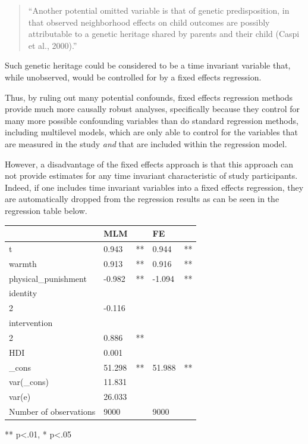\documentclass[
  letterpaper,
  DIV=11,
  numbers=noendperiod]{scrreprt}
\begin{document}
\begin{quote}
``Another potential omitted variable is that of genetic predisposition,
in that observed neighborhood effects on child outcomes are possibly
attributable to a genetic heritage shared by parents and their child
(Caspi et al., 2000).''
\end{quote}

Such genetic heritage could be considered to be a time invariant
variable that, while unobserved, would be controlled for by a fixed
effects regression.

Thus, by ruling out many potential confounds, fixed effects regression
methods provide much more causally robust analyses, specifically because
they control for many more possible confounding variables than do
standard regression methods, including multilevel models, which are only
able to control for the variables that are measured in the study
\emph{and} that are included within the regression model.

However, a disadvantage of the fixed effects approach is that this
approach can not provide estimates for any time invariant characteristic
of study participants. Indeed, if one includes time invariant variables
into a fixed effects regression, they are automatically dropped from the
regression results as can be seen in the regression table below.

\begin{longtable}[]{@{}lllll@{}}
\toprule\noalign{}
& MLM & & FE & \\
\midrule\noalign{}
\endhead
\bottomrule\noalign{}
\endlastfoot
t & 0.943 & ** & 0.944 & ** \\
warmth & 0.913 & ** & 0.916 & ** \\
physical\_punishment & -0.982 & ** & -1.094 & ** \\
identity & & & & \\
2 & -0.116 & & & \\
intervention & & & & \\
2 & 0.886 & ** & & \\
HDI & 0.001 & & & \\
\_cons & 51.298 & ** & 51.988 & ** \\
var(\_cons) & 11.831 & & & \\
var(e) & 26.033 & & & \\
Number of observations & 9000 & & 9000 & \\
\end{longtable}

** p\textless.01, * p\textless.05
\end{document}
